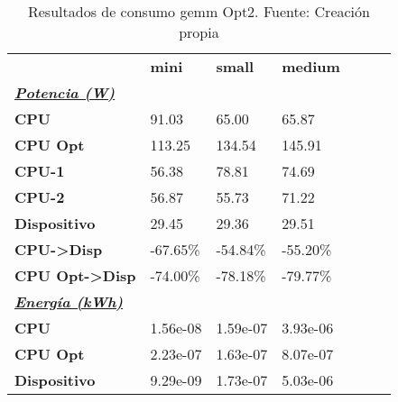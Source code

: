 \begin{table}[H]
    \centering
    \begin{tabular}{lllllll}
    \rowcolor[HTML]{DAE8FC} \ & \textbf{mini} & \textbf{	small} & \textbf{	medium} \\
    \cellcolor[HTML]{DAE8FC} \textbf{\textbf{{\emph{{\underline{{Potencia (W)}}}}}}} &  & 	 & 	 \\
    \rowcolor[HTML]{EFEFEF} \cellcolor[HTML]{DAE8FC} \textbf{CPU} & 91.03 & 	65.00 & 	65.87 \\
    \cellcolor[HTML]{DAE8FC} \textbf{CPU Opt} & 113.25 & 	134.54 & 	145.91 \\
    \rowcolor[HTML]{EFEFEF} \cellcolor[HTML]{DAE8FC} \textbf{\quad CPU-1} & 56.38 & 	78.81 & 	74.69 \\
    \cellcolor[HTML]{DAE8FC} \textbf{\quad CPU-2} & 56.87 & 	55.73 & 	71.22 \\
    \rowcolor[HTML]{EFEFEF} \cellcolor[HTML]{DAE8FC} \textbf{Dispositivo} & 29.45 & 	29.36 & 	29.51 \\
    \cellcolor[HTML]{DAE8FC} \textbf{CPU->Disp} & -67.65\% & 	-54.84\% & 	-55.20\% \\
    \rowcolor[HTML]{EFEFEF} \cellcolor[HTML]{DAE8FC} \textbf{CPU Opt->Disp} & -74.00\% & 	-78.18\% & 	-79.77\% \\
    \cellcolor[HTML]{DAE8FC} \textbf{\textbf{{\emph{{\underline{{Energía (kWh)}}}}}}} &  & 	 & 	 \\
    \rowcolor[HTML]{EFEFEF} \cellcolor[HTML]{DAE8FC} \textbf{CPU} & 1.56e-08 & 	1.59e-07 & 	3.93e-06 \\
    \cellcolor[HTML]{DAE8FC} \textbf{CPU Opt} & 2.23e-07 & 	1.63e-07 & 	8.07e-07 \\
    \rowcolor[HTML]{EFEFEF} \cellcolor[HTML]{DAE8FC} \textbf{Dispositivo} & 9.29e-09 & 	1.73e-07 & 	5.03e-06 \\
    \end{tabular}
    \caption[Resultados de consumo gemm Opt2]{{Resultados de consumo gemm Opt2. Fuente: Creación propia}}
    \label{table_test_gemm_Opt2_hw_powerResults}
\end{table}